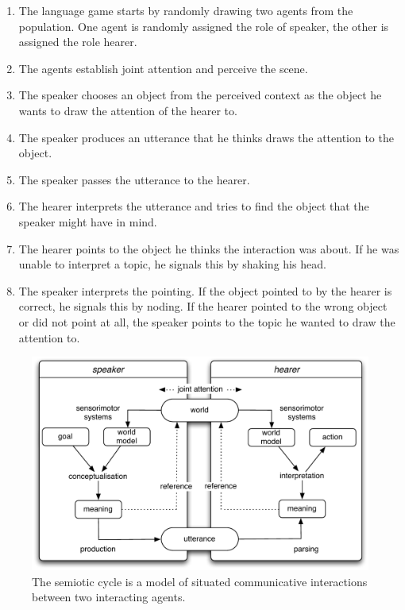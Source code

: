\begin{enumerate}
\item The language game starts by randomly drawing two agents from the population. 
One agent is randomly assigned the role of speaker, the other is assigned the role
hearer.
\item The agents establish joint attention and perceive the scene.
\item The speaker chooses an object from the perceived context as the object
he wants to draw the attention of the hearer to.
\item The speaker produces an utterance that he thinks draws the attention to the object.
\item The speaker passes the utterance to the hearer.
\item The hearer interprets the utterance and tries to find the object that the speaker
might have in mind. 
\item The hearer points to the object he thinks the interaction was about. If he was unable 
to interpret a topic, he signals this by shaking his head.
\item The speaker interprets the pointing. If the object pointed to by the hearer
is correct, he signals this by noding. If the hearer pointed to the wrong object or
did not point at all, the speaker
points to the topic he wanted to draw the attention to.
\end{enumerate}


\begin{figure}
\begin{center}
\includegraphics[width=0.9\columnwidth]{figs/semiotic-cycle}
\caption[Semiotic cycle]{The semiotic cycle is a model of situated communicative interactions between 
two interacting agents.}
\end{center}
\label{f:semiotic-cycle}
\end{figure}

